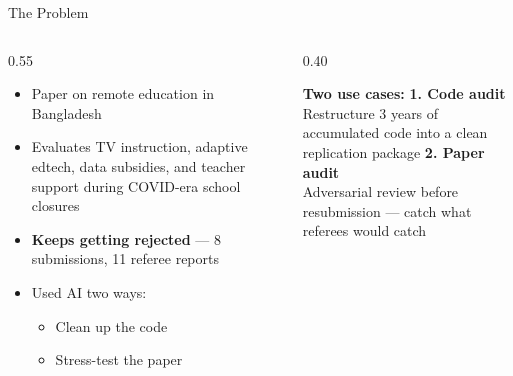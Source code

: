 \documentclass[aspectratio=169, 10pt]{beamer}
\begin{document}
\begin{frame}{The Problem}
\begin{columns}[T]
\begin{column}{0.55\textwidth}
\vskip4pt
\begin{itemize}\setlength{\itemsep}{6pt}
  \item Paper on remote education in Bangladesh
  \item Evaluates TV instruction, adaptive edtech, data subsidies, and teacher support during COVID-era school closures
  \item \textbf{Keeps getting rejected} --- 8 submissions, 11 referee reports
  \item Used AI two ways:
    \begin{itemize}
      \item Clean up the code
      \item Stress-test the paper
    \end{itemize}
\end{itemize}
\end{column}
\begin{column}{0.40\textwidth}
\begin{tcolorbox}[accentbox]
\small
\textbf{Two use cases:}
\vskip4pt
\textbf{1. Code audit}\\
Restructure 3 years of accumulated code into a clean replication package
\vskip4pt
\textbf{2. Paper audit}\\
Adversarial review before resubmission --- catch what referees would catch
\end{tcolorbox}
\end{column}
\end{columns}
\end{frame}
\end{document}
